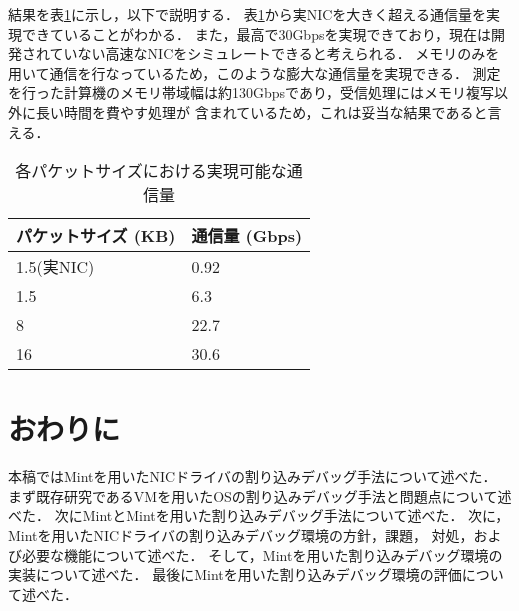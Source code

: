 \documentclass[submit,techreq,noauthor,dvipdfmx]{ipsj}
\begin{document}
結果を表\ref{throughput-nic}に示し，以下で説明する．
表\ref{throughput-nic}から実NICを大きく超える通信量を実現できていることがわかる．
また，最高で30Gbpsを実現できており，現在は開発されていない高速なNICをシミュレートできると考えられる．
メモリのみを用いて通信を行なっているため，このような膨大な通信量を実現できる．
測定を行った計算機のメモリ帯域幅は約130Gbpsであり，受信処理にはメモリ複写以外に長い時間を費やす処理が
含まれているため，これは妥当な結果であると言える．

\begin{table}[h]
    \caption{各パケットサイズにおける実現可能な通信量}
    \label{throughput-nic}
    \begin{center}
        \begin{tabular}{l|l}   \hline \hline 
            パケットサイズ (KB)      & 通信量 (Gbps)  \\ \hline
            1.5(実NIC)               & 0.92           \\
            1.5                      & 6.3            \\
            8                        & 22.7           \\
            16                       & 30.6           \\ \hline
        \end{tabular}
    \end{center}
\end{table}


\section{おわりに}\label{chap:conclusion}

本稿ではMintを用いたNICドライバの割り込みデバッグ手法について述べた．
まず既存研究であるVMを用いたOSの割り込みデバッグ手法と問題点について述べた．
次にMintとMintを用いた割り込みデバッグ手法について述べた．
次に，Mintを用いたNICドライバの割り込みデバッグ環境の方針，課題，
対処，および必要な機能について述べた．
そして，Mintを用いた割り込みデバッグ環境の実装について述べた．
最後にMintを用いた割り込みデバッグ環境の評価について述べた．
\end{document}

